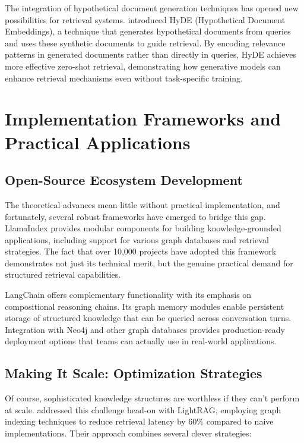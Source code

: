 The integration of hypothetical document generation techniques has opened new possibilities for retrieval systems. \citet{gao2022hyde} introduced HyDE (Hypothetical Document Embeddings), a technique that generates hypothetical documents from queries and uses these synthetic documents to guide retrieval. By encoding relevance patterns in generated documents rather than directly in queries, HyDE achieves more effective zero-shot retrieval, demonstrating how generative models can enhance retrieval mechanisms even without task-specific training.

\section{Implementation Frameworks and Practical Applications}

\subsection{Open-Source Ecosystem Development}

The theoretical advances mean little without practical implementation, and fortunately, several robust frameworks have emerged to bridge this gap. LlamaIndex \citep{liu2022llamaindex} provides modular components for building knowledge-grounded applications, including support for various graph databases and retrieval strategies. The fact that over 10,000 projects have adopted this framework demonstrates not just its technical merit, but the genuine practical demand for structured retrieval capabilities.

LangChain \citep{chase2022langchain} offers complementary functionality with its emphasis on compositional reasoning chains. Its graph memory modules enable persistent storage of structured knowledge that can be queried across conversation turns. Integration with Neo4j and other graph databases provides production-ready deployment options that teams can actually use in real-world applications.

\subsection{Making It Scale: Optimization Strategies}

Of course, sophisticated knowledge structures are worthless if they can't perform at scale. \citet{guo2024lightrag} addressed this challenge head-on with LightRAG, employing graph indexing techniques to reduce retrieval latency by 60\% compared to naive implementations. Their approach combines several clever strategies:

